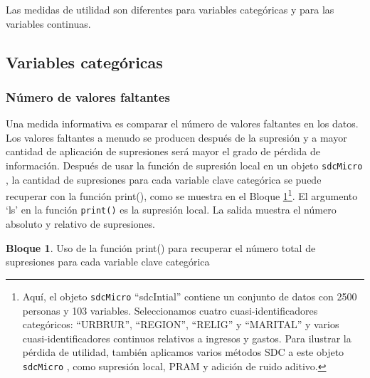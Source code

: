 \documentclass[
]{book}
\theoremstyle{definition}
\theoremstyle{definition}
\newtheorem{example}{Bloque}[chapter]
\theoremstyle{definition}
\theoremstyle{definition}
\theoremstyle{remark}
\begin{document}
Las medidas de utilidad son diferentes para variables categóricas y para
las variables continuas.

\hypertarget{variables-categuxf3ricas}{%
\subsection{Variables categóricas}\label{variables-categuxf3ricas}}

\hypertarget{nuxfamero-de-valores-faltantes}{%
\subsubsection{Número de valores faltantes}\label{nuxfamero-de-valores-faltantes}}

Una medida informativa es comparar el número de valores faltantes en los datos. Los valores faltantes a menudo se producen después de la supresión y a mayor cantidad de aplicación de supresiones será mayor el grado de pérdida de información. Después de usar la función de supresión local en un objeto \texttt{sdcMicro} , la cantidad de supresiones para cada variable clave categórica se puede recuperar con la función print(), como se muestra en el Bloque \ref{exm:bloque1lbn}\footnote{Aquí, el objeto \texttt{sdcMicro} ``sdcIntial'' contiene un conjunto de datos con 2500 personas y 103 variables. Seleccionamos cuatro cuasi-identificadores categóricos: ``URBRUR'', ``REGION'', ``RELIG'' y ``MARITAL'' y varios cuasi-identificadores continuos relativos a ingresos y gastos. Para ilustrar la pérdida de utilidad, también aplicamos varios métodos SDC a este objeto \texttt{sdcMicro} , como supresión local, PRAM y adición de ruido aditivo.}. El argumento `ls' en la función \texttt{print()} es la supresión local. La salida muestra el número absoluto y relativo de supresiones.

\begin{example}
\protect\hypertarget{exm:bloque1lbn}{}\label{exm:bloque1lbn}Uso de la función print() para recuperar el número total de supresiones para cada variable clave categórica
\end{example}
\end{document}
